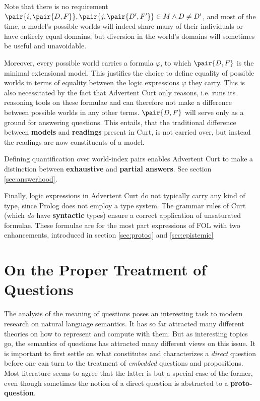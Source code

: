 \documentclass[notitlepage,twoside,a4paper]{scrreprt}
\newcommand{\stress}{\textbf} %
\newcommand{\term}[1]{\textsf{\textbf{#1}}} %
\newcommand{\pn}{\textsf} %
\newcommand{\curt}{\pn{Curt}}
\newcommand{\acurt}{\pn{Advertent Curt}}
\newcommand{\prol}{\pn{Prolog}}
\theoremstyle{remark}
\theoremstyle{remark}
\theoremstyle{definition}
\theoremstyle{definition}
\begin{document}
Note that there is no requirement $\pair{i,\pair{D,F}}, \pair{j,\pair{D',F'}}
\in M \wedge D\neq D'$, and most of the time, a model's possible worlds will
indeed share many of their individuals or have entirely equal domains, but
diversion in the world's domains will sometimes be useful and unavoidable.

Moreover, every possible world carries a formula $\varphi$, to which $\pair{D,F}$
is the minimal extensional model. This justifies the choice to define equality
of possible worlds in terms of equality between the logic expressions $\varphi$
they carry. This is also necessitated by the fact that \acurt{}  only reasons,
i.e. runs its reasoning tools on these formulae and can therefore not make a
difference between possible worlds in any other terms. $\pair{D,F}$ will serve
only as a ground for answering questions. This entails, that the traditional
difference between \term{models} and \term{readings} present in \curt, is not
carried over, but instead the readings are now constituents of a model.

Defining quantification over world-index pairs enables \acurt{} to make a
distinction between \term{exhaustive} and \term{partial answers}. See section
\ref{sec:answerhood}.

Finally, logic expressions in \acurt{} do not typically carry any kind of type,
since \prol{} does not employ a type system. The grammar rules of \curt{} (which
\emph{do} have \stress{syntactic} types) ensure a correct application of
unsaturated formulae. These formulae are for the most part expressions of \pn{FOL}
with two enhancements, introduced in section \ref{sec:protoq} and \ref{sec:epistemic}

\section{On the Proper Treatment of Questions}

The analysis of the meaning of questions poses an interesting task to modern
research on natural language semantics. It has so far attracted many different
theories on how to represent and compute with them.
But as interesting topics go, the semantics of questions
has attracted many different views on this issue.  It is important to first
settle on what constitutes and characterizes a \emph{direct} question before one
can turn to the treatment of \emph{embedded} questions and propositions. Most
literature seems to agree that the latter is but a special case of the former,
even though sometimes the notion of a direct question is abstracted to a
\term{proto-question}.
\end{document}
